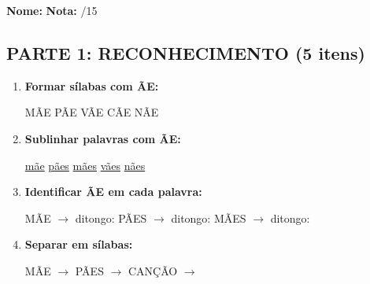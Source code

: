 \begin{exercicio}

\noindent\textbf{Nome:} \underline{\hspace{4cm}} \quad \textbf{Nota:} \underline{\hspace{1cm}}/15

\subsection*{PARTE 1: RECONHECIMENTO (5 itens)}

\begin{enumerate}
  \item \textbf{Formar sílabas com ÃE:}
  \begin{center}
  MÃE \quad PÃE \quad VÃE \quad CÃE \quad NÃE
  \end{center}

  \item \textbf{Sublinhar palavras com ÃE:}
  \begin{center}
  \uline{mãe} \quad \uline{pães} \quad \uline{mães} \quad \uline{vães} \quad \uline{nães}
  \end{center}

  \item \textbf{Identificar ÃE em cada palavra:}
  \begin{center}
  MÃE $\rightarrow$ ditongo: \underline{\hspace{1cm}} \quad PÃES $\rightarrow$ ditongo: \underline{\hspace{1cm}} \quad MÃES $\rightarrow$ ditongo: \underline{\hspace{1cm}}
  \end{center}

  \item \textbf{Separar em sílabas:}
  \begin{center}
  MÃE $\rightarrow$ \underline{\hspace{1.5cm}} \quad PÃES $\rightarrow$ \underline{\hspace{1.5cm}} \underline{\hspace{1.5cm}} \quad CANÇÃO $\rightarrow$ \underline{\hspace{1.5cm}} \underline{\hspace{1.5cm}} \underline{\hspace{1.5cm}}
  \end{center}


\end{enumerate}
\end{exercicio}
